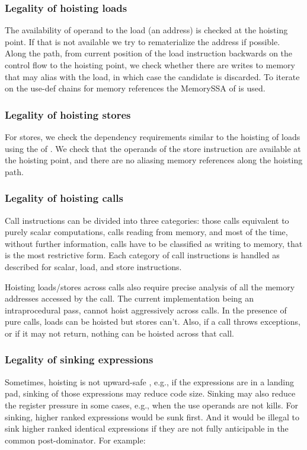 \documentclass[sigplan,10pt,review,anonymous]{acmart}\settopmatter{printfolios=true,printccs=false,printacmref=false}
\begin{document}
\subsubsection{Legality of hoisting loads}
The availability of operand to the load (an address) is checked at the hoisting
point. If that is not available we try to rematerialize the address if
possible.  Along the path, from current position of the load instruction
backwards on the control flow to the hoisting point, we check whether there are
writes to memory that may alias with the load, in which case the candidate is
discarded. To iterate on the use-def chains for memory references the MemorySSA
of \LLVM{} is used.

\subsubsection{Legality of hoisting stores}
For stores, we check the dependency requirements similar to the hoisting of
loads using the \MemorySSA{} of \LLVM{}. We check that the operands of the store
instruction are available at the hoisting point, and there are no aliasing
memory references along the hoisting path.

\subsubsection{Legality of hoisting calls}
Call instructions can be divided into three categories: those calls equivalent
to purely scalar computations, calls reading from memory, and most of the time,
without further information, calls have to be classified as writing to memory,
that is the most restrictive form.  Each category of call instructions is
handled as described for scalar, load, and store instructions.

Hoisting loads/stores across calls also require precise analysis of all the
memory addresses accessed by the call. The current implementation being an
intraprocedural pass, cannot hoist aggressively across calls. In the presence of
pure calls, loads can be hoisted but stores can't. Also, if a call throws
exceptions, or if it may not return, nothing can be hoisted across that call.

\subsubsection{Legality of sinking expressions}
\label{subsec:legality-sink}
Sometimes, hoisting is not upward-safe \cite{click1995global}, e.g., if the
expressions are in a landing pad, sinking of those expressions
may reduce code size. Sinking may also reduce the register pressure in some
cases, e.g., when the use operands are not kills. For sinking, higher ranked
expressions would be sunk first. And it would be illegal to sink higher ranked
identical expressions if they are not fully anticipable in the common
post-dominator. For example:
\end{document}
